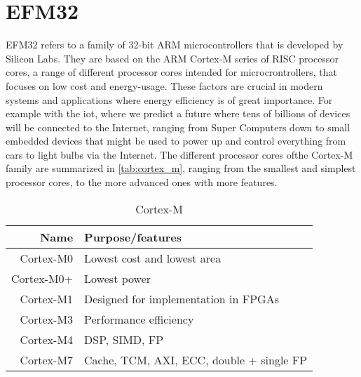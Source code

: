
\section{EFM32}
\label{sub:emf32}

EFM32 refers to a family of 32-bit ARM microcontrollers that is developed by Silicon Labs.
They are based on the ARM Cortex-M series of RISC processor cores, a range of different processor cores intended for microcrontrollers, that focuses on low cost and energy-usage.
These factors are crucial in modern systems and applications where energy efficiency is of great importance.
For example with the \gls{iot}, where we predict a future where tens of billions of devices will be connected to the Internet, ranging from Super Computers down to small embedded devices that might be used to power up and control everything from cars to light bulbs via the Internet.
The different processor cores ofthe Cortex-M family are summarized in \autoref{tab:cortex_m}, ranging from the smallest and simplest processor cores, to the more advanced ones with more features.

\begin{table}
\begin{center}
\begin{tabular}{r|l}
\textbf{Name} & \textbf{Purpose/features}            \\
\hline
Cortex-M0 & Lowest cost and lowest area              \\
Cortex-M0+ & Lowest power                            \\
Cortex-M1 & Designed for implementation in FPGAs     \\
Cortex-M3 & Performance efficiency                   \\
Cortex-M4 & DSP, SIMD, FP                            \\
Cortex-M7 & Cache, TCM, AXI, ECC, double + single FP \\
\end{tabular}
\end{center}
\caption{Cortex-M}
\label{tab:cortex_m}
\end{table}

